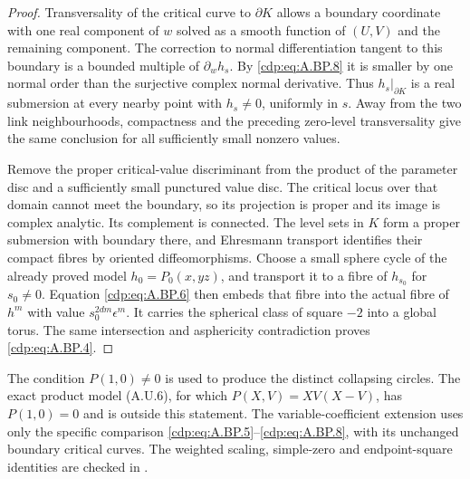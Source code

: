 \begin{proof}
Transversality of the critical curve to $\partial K$
allows a boundary coordinate with one real component
of $w$ solved as a smooth function of $(U,V)$ and
the remaining component. The correction to normal
differentiation tangent to this boundary is a
bounded multiple of $\partial_w h_s$.
By \eqref{cdp:eq:A.BP.8} it is smaller by one normal order than
the surjective complex normal derivative. Thus
$h_s|_{\partial K}$ is a real submersion at every
nearby point with $h_s\ne0$, uniformly in $s$.
Away from the two link neighbourhoods, compactness
and the preceding zero-level transversality give
the same conclusion for all sufficiently small
nonzero values.

Remove the proper critical-value discriminant from
the product of the parameter disc and a sufficiently
small punctured value disc. The critical locus over
that domain cannot meet the boundary, so its
projection is proper and its image is complex
analytic. Its complement is connected. The level
sets in $K$ form a proper submersion with boundary
there, and Ehresmann transport identifies their
compact fibres by oriented diffeomorphisms.
Choose a small sphere cycle of the already proved
model $h_0=P_0(x,yz)$, and transport it to a fibre
of $h_{s_0}$ for $s_0\ne0$. Equation \eqref{cdp:eq:A.BP.6}
then embeds that fibre into the actual fibre
of $h^m$ with value $s_0^{2dm}\epsilon^m$.
It carries the spherical class of square $-2$
into a global torus. The same intersection and
asphericity contradiction proves \eqref{cdp:eq:A.BP.4}.
\end{proof}

The condition $P(1,0)\ne0$ is used to produce the
distinct collapsing circles. The exact product
model (A.U.6), for which $P(X,V)=XV(X-V)$, has
$P(1,0)=0$ and is outside this statement.
The variable-coefficient extension uses only the
specific comparison \eqref{cdp:eq:A.BP.5}--\eqref{cdp:eq:A.BP.8}, with its
unchanged boundary critical curves. The weighted scaling,
simple-zero and endpoint-square identities are
checked in .

